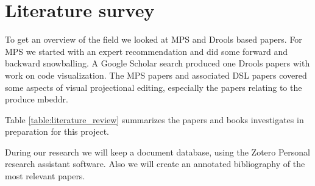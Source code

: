 \section{Literature survey}

To get an overview of the field we looked at MPS and Drools based papers.  
For MPS we started with an expert recommendation and did some forward and backward snowballing.
A Google Scholar search produced one Drools papers with work on code visualization. 
The MPS papers and associated DSL papers covered some aspects of visual projectional editing, especially the papers relating to the produce mbeddr.

Table \ref{table:literature_review} summarizes the papers and books investigates in preparation for this project.

During our research we will keep a document database, using the Zotero Personal research assistant software\cite{Zotero_product_page}.
Also we will create an annotated bibliography of the most relevant papers.


